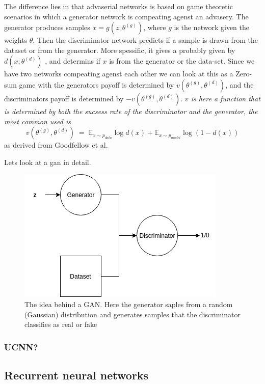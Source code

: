 The difference lies in that advaserial networks is based on game theoretic scenarios in which a generator network is compeating agenst an advasery. 
The generator produces samples $x=g(z;\theta^{(g)})$, where $g$ is the network given the weights $\theta$. Then the discriminator network predicts if a sample is drawn from the dataset or from the generator.
More spessific, it gives a probably given by $d(x;\theta^{(d)})$ , and determins if $x$ is from the generator or the data-set. 
Since we have two networks compeating agenst each other we can look at this as a Zero-sum game with the generators payoff is determined by $v(\theta^{(g)},\theta^{(d)})$, and the discriminators payoff is determined by $-v(\theta^{(g)},\theta^{(d)})$.
\textit{$v$ is here a function that is determined by both the sucsess rate of the discriminator and the generator, the most common used is}
\begin{equation} %
	v(\theta^{(g)},\theta^{(d)}) \; = \; \mathds{E}_{x\sim p_{data}}\log{d(x)} + \mathds{E}_{x\sim p_{model}}\log{(1 - d(x))} 
\end{equation}
as derived from Goodfellow et al. %
	  
Lets look at a gan in detail. \\
\begin{figure}[ht!]
	\centering
	\includegraphics[scale=0.5]{background/figures/simpleGAN.png}
	\caption{The idea behind a GAN. Here the generator saples from a random (Gaussian) distribution and generates samples that the discriminator classifies as real or fake}
\end{figure}
	
\subsubsection{UCNN?}	
\subsection{Recurrent neural networks}
